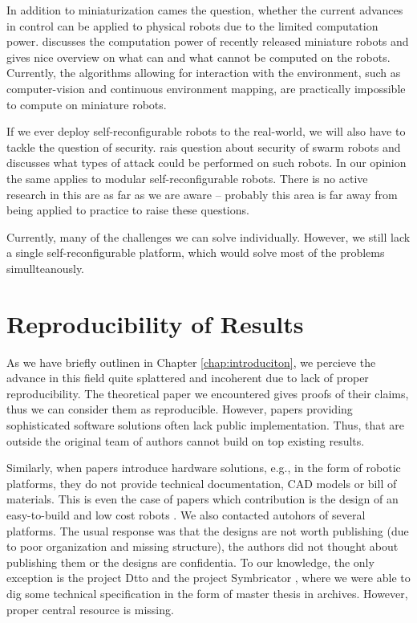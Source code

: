 In addition to miniaturization cames the question, whether the current advances
in control can be applied to physical robots due to the limited computation
power. \textcite{DBLP:journals/ral/Trenkwalder19} discusses the computation
power of recently released miniature robots and gives nice overview on what can
and what cannot be computed on the robots. Currently, the algorithms allowing
for interaction with the environment, such as computer-vision and continuous
environment mapping, are practically impossible to compute on miniature robots.

If we ever deploy self-reconfigurable robots to the real-world, we will also
have to tackle the question of security. \textcite{DBLP:conf/icas/HigginsTM09}
rais question about security of swarm robots and discusses what types of
attack could be performed on such robots. In our opinion the same applies to
modular self-reconfigurable robots. There is no active research in this are as
far as we are aware -- probably this area is far away from being applied to
practice to raise these questions.

Currently, many of the challenges we can solve individually. However, we still
lack a single  self-reconfigurable platform, which would
solve most of the problems simullteanously.

\section{Reproducibility of Results}\label{sec:reproducibility}

As we have briefly outlinen in Chapter \ref{chap:introduciton}, we percieve the
advance in this field quite splattered and incoherent due to lack of proper
reproducibility. The theoretical paper we encountered gives proofs of their
claims, thus we can consider them as reproducible. However, papers providing
sophisticated software solutions often lack public implementation. Thus, that
are outside the original team of authors cannot build on top existing results.

Similarly, when papers introduce hardware solutions, e.g., in the form of
robotic platforms, they do not provide technical documentation, CAD models or
bill of materials. This is even the case of papers which contribution is the
design of an easy-to-build and low cost robots \cite{DBLP:conf/robio/YuLW17}. We
also contacted autohors of several platforms. The usual response was that the
designs are not worth publishing (due to poor organization and missing
structure), the authors did not thought about publishing them or the designs are
confidentia. To our knowledge, the only exception is the project Dtto
\cite{otrebla333} and the project Symbricator
\cite{DBLP:journals/corr/abs-1109-2288}, where we were able to dig some
technical specification in the form of master thesis in archives. However,
proper central resource is missing.
